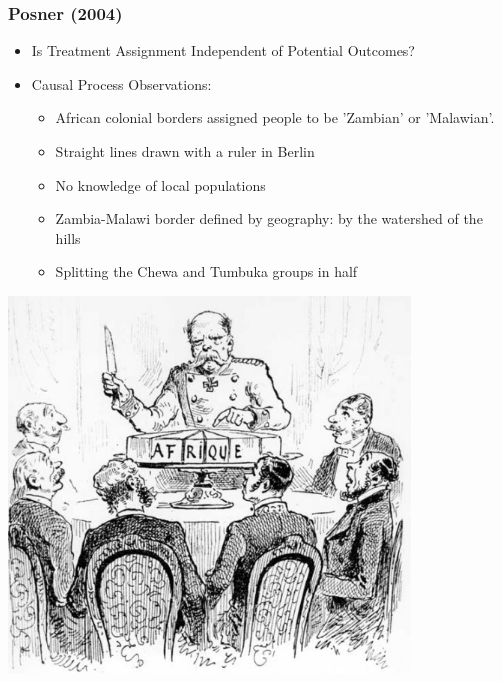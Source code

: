 \documentclass[xcolor=x11names,compress]{beamer}\usepackage[]{graphicx}\usepackage[]{color}
\renewcommand{\(}{\begin{columns}}
\renewcommand{\)}{\end{columns}}
\newcommand{\<}[1]{\begin{column}{#1}}
\renewcommand{\>}{\end{column}}
\begin{document}
\begin{frame}
\frametitle{Posner (2004)}
\begin{itemize}
\item Is Treatment Assignment Independent of Potential Outcomes?
\pause
\item Causal Process Observations:
\pause
\begin{itemize}
\item African colonial borders assigned people to be 'Zambian' or 'Malawian'. 
\pause
\item Straight lines drawn with a ruler in Berlin
\pause
\item No knowledge of local populations
\pause
\item Zambia-Malawi border defined by geography: by the watershed of the hills
\pause
\item Splitting the Chewa and Tumbuka groups in half
\end{itemize}
\end{itemize}
\end{frame}

\begin{frame}
\includegraphics[width=0.8\textwidth]{Arbitrary_borders.jpg}
\end{frame}
\end{document}
